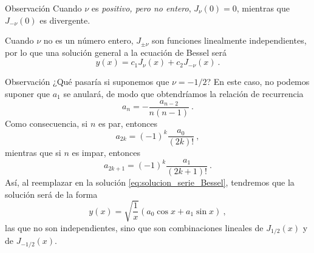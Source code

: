 \begin{obs}{Observación}
    Cuando $\nu$ es \emph{positivo, pero no entero}, $J_\nu(0) = 0$, mientras que $J_{-\nu}(0)$ es divergente.
\end{obs}


Cuando $\nu$ no es un número entero, $J_{\pm \nu}$ son funciones linealmente independientes, por lo que una solución general a la ecuación de Bessel será
\begin{equation}
    y(x) = c_1 J_\nu(x) + c_2 J_{-\nu}(x) \ .
\end{equation}

\begin{obs}{Observación}
    ¿Qué pasaría si suponemos que $\nu = -1/2$? En este caso, no podemos suponer que $a_1$ se anulará, de modo que obtendríamos la relación de recurrencia
    \begin{equation}
        a_n = - \frac{a_{n-2}}{n(n-1)} \ .
    \end{equation}
    Como consecuencia, si $n$ es par, entonces
    \begin{equation}
        a_{2k} = (-1)^k \frac{a_0}{(2k)!} \ ,
    \end{equation}
    mientras que si $n$ es impar, entonces
    \begin{equation}
        a_{2k+1} = (-1)^k \frac{a_1}{(2k+1)!} \ .
    \end{equation}
    Así, al reemplazar en la solución \eqref{eq:solucion_serie_Bessel}, tendremos que la solución será de la forma
    \begin{equation}
        y(x) = \sqrt{\frac{1}{x}} (a_0 \cos x + a_1 \sin x ) \ ,
    \end{equation} 
    las que no son independientes, sino que son combinaciones lineales de $J_{1/2}(x)$ y de $J_{-1/2}(x)$.
\end{obs}


